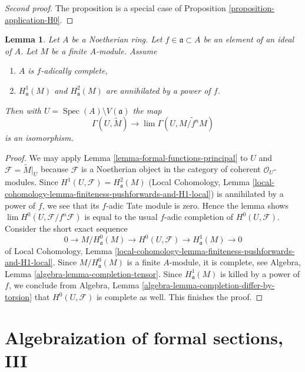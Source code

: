 \documentclass{stacks-project}
\theoremstyle{plain}
\newtheorem{lemma}[subsection]{Lemma}
\theoremstyle{definition}
\theoremstyle{remark}
\numberwithin{equation}{subsection}
\def\lim{\mathop{\mathrm{lim}}\nolimits}
\def\Spec{\mathop{\mathrm{Spec}}}
\begin{document}
\begin{proof}[Second proof]
The proposition is a special case of
Proposition \ref{proposition-application-H0}.
\end{proof}

\begin{lemma}
\label{lemma-alternative-H0}
Let $A$ be a Noetherian ring. Let $f \in \mathfrak a \subset A$
be an element of an ideal of $A$. Let $M$ be a finite $A$-module.
Assume
\begin{enumerate}
\item $A$ is $f$-adically complete,
\item $H^1_\mathfrak a(M)$ and $H^2_\mathfrak a(M)$ are
annihilated by a power of $f$.
\end{enumerate}
Then with $U = \Spec(A) \setminus V(\mathfrak a)$ the map
$$
\Gamma(U, \widetilde{M})
\longrightarrow
\lim \Gamma(U, \widetilde{M/f^nM})
$$
is an isomorphism.
\end{lemma}

\begin{proof}
We may apply Lemma \ref{lemma-formal-functions-principal} to $U$ and
$\mathcal{F} = \widetilde{M}|_U$ because $\mathcal{F}$ is a Noetherian object in
the category of coherent $\mathcal{O}_U$-modules.
Since $H^1(U, \mathcal{F}) = H^2_\mathfrak a(M)$
(Local Cohomology, Lemma
\ref{local-cohomology-lemma-finiteness-pushforwards-and-H1-local})
is annihilated by a power of $f$, we see that
its $f$-adic Tate module is zero.
Hence the lemma shows $\lim H^0(U, \mathcal{F}/f^n \mathcal{F})$
is equal to the usual $f$-adic completion of $H^0(U, \mathcal{F})$.
Consider the short exact sequence
$$
0 \to M/H^0_\mathfrak a(M) \to H^0(U, \mathcal{F}) \to H^1_\mathfrak a(M) \to 0
$$
of Local Cohomology, Lemma
\ref{local-cohomology-lemma-finiteness-pushforwards-and-H1-local}.
Since $M/H^0_\mathfrak a(M)$ is a finite $A$-module, it is
complete, see Algebra, Lemma \ref{algebra-lemma-completion-tensor}.
Since $H^1_\mathfrak a(M)$ is killed by a power of $f$, we conclude
from Algebra, Lemma \ref{algebra-lemma-completion-differ-by-torsion}
that $H^0(U, \mathcal{F})$ is complete as well. This finishes the proof.
\end{proof}







\section{Algebraization of formal sections, III}
\label{section-algebraization-sections-coherent-III}
\end{document}
